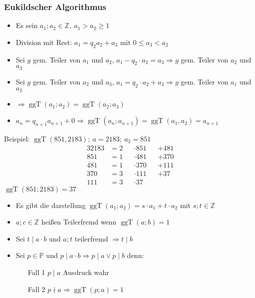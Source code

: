 \documentclass[12pt,a4paper]{article}
\DeclareMathOperator\ggt{ggT}
\begin{document}
\subsubsection{Eukildscher Algorithmus}
\begin{itemize}
	\item Es sein $a_1;a_2 \in \mathbb{Z},\ a_1 > a_2 \geq 1$
	\item Division mit Rest: $a_1 = q_2 a_2 + a_3$ mit $0 \leq a_3 < a_2$
	\item Sei $g$ gem. Teiler von $a_1$ und $a_2$, $a_1 - q_2 \cdot a_2 = a_3 \Rightarrow g$ gem. Teiler von $a_2$ und $a_3$
	\item Sei $g$ gem. Teiler von $a_2$ und $a_3$, $a_1 = q_2 \cdot a_2 + a_3 \Rightarrow g$ gem. Teiler von $a_1$ und $a_2$
	\item $\Rightarrow \ggt(a_1;a_2) = \ggt(a_2;a_3)$
	\item $a_{n}=q_{n+1}a_{n+1} + 0 \Rightarrow \ggt(a_n;a_{n+1}) = \ggt(a_1,a_2) = a_{n+1}$
\end{itemize}
Beispiel: $\ggt(851,2183);\ a=2183;\ a_2 = 851$
\begin{alignat*}{3}
	2183 & = 2 &  & \cdot 851 &  & + 481 \\
	851  & = 1 &  & \cdot 481 &  & + 370 \\
	481  & = 1 &  & \cdot 370 &  & + 111 \\
	370  & = 3 &  & \cdot 111 &  & + 37  \\
	111  & = 3 &  & \cdot 37
\end{alignat*}
$\ggt(851;2183) = 37$
\begin{itemize}
	\item Es gibt die darstellung $\ggt(a_1;a_2) = s\cdot a_1 + t \cdot a_2$ mit $s;t \in \mathbb{Z}$
	\item $a;c \in \mathbb{Z}$ heißen Teilerfremd wenn $\ggt(a;b) = 1$
	\item Sei $t \mid a \cdot b$ und $a;t$ teilerfremd $\Rightarrow t \mid b$
	\item Sei $p \in \mathbb{P}$ und $p \mid a \cdot b \Rightarrow p \mid a \vee p \mid b$ denn:
	      \begin{itemize}
		      \item[Fall 1] $p \mid a$ Ausdruck wahr
		      \item[Fall 2] $p \nmid a \Rightarrow \ggt(p;a) = 1$
	      \end{itemize}
\end{itemize}
\end{document}
